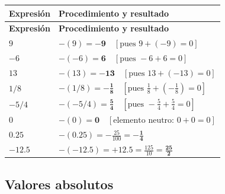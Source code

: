 \documentclass[spanish,letterpaper,oneside]{article}
\begin{document}
{\small{}\renewcommand{\arraystretch}{1.45}
\begin{longtable}{|>{\raggedright\arraybackslash}p{}|>{\raggedright\arraybackslash}p{}|}\hline
\rowcolor{iiiepePale} \textbf{Expresión} & \textbf{Procedimiento y resultado} \\\hline
\endfirsthead
\hline
\rowcolor{iiiepePale} \textbf{Expresión} & \textbf{Procedimiento y resultado} \\\hline
\endhead
$9$ & $-(9)=\mathbf{-9}\quad [\text{pues }9+(-9)=0]$ \\\hline
$-6$ & $-(-6)=\mathbf{6}\quad [\text{pues }-6+6=0]$ \\\hline
$13$ & $-(13)=\mathbf{-13}\quad [\text{pues }13+(-13)=0]$ \\\hline
$1/8$ & $-(1/8)=\mathbf{-\frac{1}{8}}\quad [\text{pues }\frac{1}{8}+(-\frac{1}{8})=0]$ \\\hline
$-5/4$ & $-(-5/4)=\mathbf{\frac{5}{4}}\quad [\text{pues }-\frac{5}{4}+\frac{5}{4}=0]$ \\\hline
$0$ & $-(0)=\mathbf{0}\quad [\text{elemento neutro: }0+0=0]$ \\\hline
$0.25$ & $-(0.25)=-\frac{25}{100}=\mathbf{-\frac{1}{4}}$ \\\hline
$-12.5$ & $-(-12.5)=+12.5=\frac{125}{10}=\mathbf{\frac{25}{2}}$ \\\hline
\end{longtable}}

\subsection*{Valores absolutos}
\end{document}
